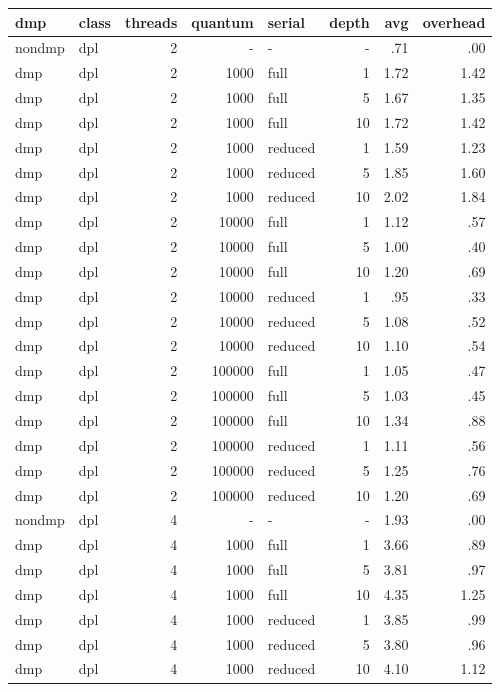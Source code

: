 \begin{center}
\begin{small}
\begin{longtable}{llrrlrrr}
\hline
dmp & class & threads & quantum & serial & depth & avg & overhead\\
\hline
nondmp & dpl & 2 & - & - & - & .71 & .00\\
dmp & dpl & 2 & 1000 & full & 1 & 1.72 & 1.42\\
dmp & dpl & 2 & 1000 & full & 5 & 1.67 & 1.35\\
dmp & dpl & 2 & 1000 & full & 10 & 1.72 & 1.42\\
dmp & dpl & 2 & 1000 & reduced & 1 & 1.59 & 1.23\\
dmp & dpl & 2 & 1000 & reduced & 5 & 1.85 & 1.60\\
dmp & dpl & 2 & 1000 & reduced & 10 & 2.02 & 1.84\\
dmp & dpl & 2 & 10000 & full & 1 & 1.12 & .57\\
dmp & dpl & 2 & 10000 & full & 5 & 1.00 & .40\\
dmp & dpl & 2 & 10000 & full & 10 & 1.20 & .69\\
dmp & dpl & 2 & 10000 & reduced & 1 & .95 & .33\\
dmp & dpl & 2 & 10000 & reduced & 5 & 1.08 & .52\\
dmp & dpl & 2 & 10000 & reduced & 10 & 1.10 & .54\\
dmp & dpl & 2 & 100000 & full & 1 & 1.05 & .47\\
dmp & dpl & 2 & 100000 & full & 5 & 1.03 & .45\\
dmp & dpl & 2 & 100000 & full & 10 & 1.34 & .88\\
dmp & dpl & 2 & 100000 & reduced & 1 & 1.11 & .56\\
dmp & dpl & 2 & 100000 & reduced & 5 & 1.25 & .76\\
dmp & dpl & 2 & 100000 & reduced & 10 & 1.20 & .69\\
nondmp & dpl & 4 & - & - & - & 1.93 & .00\\
dmp & dpl & 4 & 1000 & full & 1 & 3.66 & .89\\
dmp & dpl & 4 & 1000 & full & 5 & 3.81 & .97\\
dmp & dpl & 4 & 1000 & full & 10 & 4.35 & 1.25\\
dmp & dpl & 4 & 1000 & reduced & 1 & 3.85 & .99\\
dmp & dpl & 4 & 1000 & reduced & 5 & 3.80 & .96\\
dmp & dpl & 4 & 1000 & reduced & 10 & 4.10 & 1.12\\

\end{longtable}
\end{small}
\end{center}
